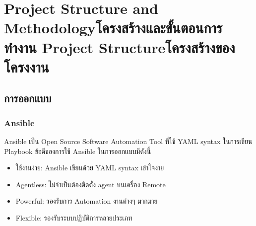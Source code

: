 \chapter{\ifproject%
\ifenglish Project Structure and Methodology\else โครงสร้างและขั้นตอนการทำงาน\fi
\else%
\ifenglish Project Structure\else โครงสร้างของโครงงาน\fi
\fi
}

\makeatletter


\makeatother

\section{การออกแบบ}

\subsection{Ansible}
\hspace{0.5in} Ansible เป็น Open Source Software Automation Tool ที่ใช้ YAML syntax ในการเขียน Playbook ข้อดีของการใช้ Ansible ในการออกแบบมีดังนี้ 
\begin{itemize}
  \item ใช้งานง่าย: Ansible เขียนด้วย YAML syntax เข้าใจง่าย
  \item Agentless: ไม่จำเป็นต้องติดตั้ง agent บนเครื่อง Remote
  \item Powerful: รองรับการ Automation งานต่างๆ มากมาย
  \item Flexible: รองรับระบบปฏิบัติการหลายประเภท
\end{itemize}

